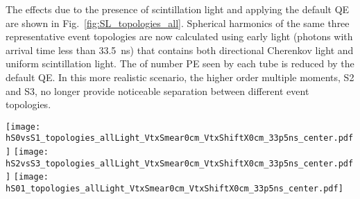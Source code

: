 The effects due to the presence of scintillation light and applying the default QE are shown in Fig.~\ref{fig:SL_topologies_all}. Spherical harmonics of the same three representative event topologies are now calculated using early light (photons with arrival time less than 33.5~ns) that contains both directional Cherenkov light and uniform scintillation light. The of number PE seen by each tube is reduced by the default QE. In this more realistic scenario, the higher order multiple moments, S2 and S3, no longer provide noticeable separation between different event topologies.


\begin{figure*}[h]
  \centering
  \texttt{[image: hS0vsS1\_topologies\_allLight\_VtxSmear0cm\_VtxShiftX0cm\_33p5ns\_center.pdf]}
  \texttt{[image: hS2vsS3\_topologies\_allLight\_VtxSmear0cm\_VtxShiftX0cm\_33p5ns\_center.pdf]}
  \texttt{[image: hS01\_topologies\_allLight\_VtxSmear0cm\_VtxShiftX0cm\_33p5ns\_center.pdf]}
  \caption{Spherical harmonics for three event topologies: two
    back-to-back 1.26~MeV electrons (\emph{black squares and black
      dotted line}), two 1.26~MeV electrons at 90$^{\circ}$ angle
    (\emph{blue triangles and blue dashed line}), and a single
    2.529~MeV electron representing $^{8}$B background (\emph{red
      crosses and red solid line}). Simulation of 1000 events
    originated at the center of the sphere. Separation between
    Cherenkov and scintillation light is implemented 33.5~ns cut on
    the photon arrival time. Perfect vertex reconstruction - true
    vertex position is used. \emph{Top left:} $S_0$ versus $S_1$
    scatter plot. Black dotted line is a linear fit of the
    90$^{\circ}$ topology and $^{8}$B events. Variable $S_{01}$ is
    defined as a projection of 2D distribution onto this linear
    fit. \emph{Top right:} $S_2$ versus $S_3$ scatter
    plot. \emph{Bottom:} $S_{01}$ distributions for the three
    topologies. These distributions are normalized to unit area for
    shape comparison}
\label{fig:SL_topologies_all}
\end{figure*}

